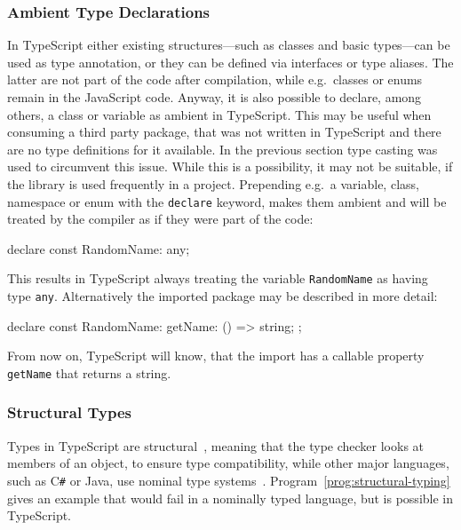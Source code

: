 \subsubsection{Ambient Type Declarations}
\label{sec:ts-ambient-type-declarations}
In TypeScript either existing structures---such as classes and basic types---can be used as type annotation, or they can be defined via interfaces or type aliases. The latter are not part of the code after compilation, while e.g.\ classes or enums remain in the JavaScript code. Anyway, it is also possible to declare, among others, a class or variable as ambient in TypeScript. This may be useful when consuming a third party package, that was not written in TypeScript and there are no type definitions for it available. In the previous section type casting was used to circumvent this issue. While this is a possibility, it may not be suitable, if the library is used frequently in a project. Prepending e.g.\ a variable, class, namespace or enum with the \texttt{declare} keyword, makes them ambient and will be treated by the compiler as if they were part of the code:
\begin{JsCode}[numbers=none]
declare const RandomName: any;
\end{JsCode}
This results in TypeScript always treating the variable \texttt{RandomName} as having type \texttt{any}. Alternatively the imported package may be described in more detail:
\begin{JsCode}[numbers=none]
declare const RandomName: {
  getName: () => string;
};
\end{JsCode}
From now on, TypeScript will know, that the import has a callable property \texttt{getName} that returns a string.


\subsubsection{Structural Types}
\label{sec:ts-structural-types}

Types in TypeScript are structural~\cite[p.~11]{TypeScriptBook:Syed:2017}, meaning that the type checker looks at members of an object, to ensure type compatibility, while other major languages, such as C\texttt{\#} or Java, use nominal type systems~\cite{TypeScriptHandbook:TypeCompatibility}. Program~\ref{prog:structural-typing} gives an example that would fail in a nominally typed language, but is possible in TypeScript.

